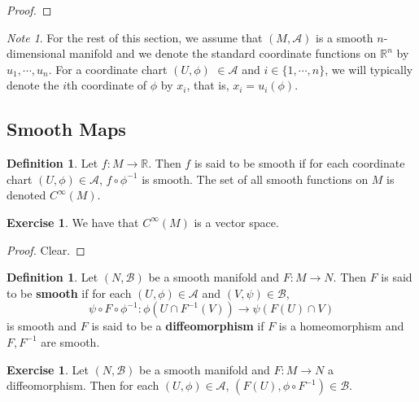 \documentclass[12pt]{amsart}
\theoremstyle{definition}
\newtheorem{defn}[definition]{Definition}
\theoremstyle{remark}
\newtheorem{note}[remark]{Note}
\theoremstyle{definition}
\newtheorem{ex}[definition]{Exercise}
\newcommand{\R}{\mathbb{R}}
\newcommand{\MA}{\mathcal{A}}
\newcommand{\MB}{\mathcal{B}}
\begin{document}
	\begin{proof}
		
	\end{proof}
	
	\begin{note}
		For the rest of this section, we assume that $(M, \MA)$ is a smooth $n$-dimensional manifold and we denote the standard coordinate functions on $\R^n$ by $u_1, \cdots, u_n$. For a coordinate chart $(U, \phi)$ $\in \MA$ and $i \in \{1, \cdots, n\}$, we will typically denote the $i$th coordinate of $\phi$ by $x_i$, that is,  $x_i = u_i(\phi)$.
	\end{note}
	
	\newpage 
	
	
	\subsection{Smooth Maps}	
	
	\begin{defn}
		Let $f: M \rightarrow \R$. Then $f$ is said to be smooth if for each coordinate chart $(U, \phi) \in \MA$, $f \circ \phi^{-1}$ is smooth. The set of all smooth functions on $M$ is denoted $C^{\infty}(M)$. 
	\end{defn}

	\begin{ex}
		We have that $C^{\infty}(M)$ is a vector space.
	\end{ex}

	\begin{proof}
		Clear.
	\end{proof}

	\begin{defn}
		Let $(N, \MB)$ be a smooth manifold and $F: M \rightarrow N$. Then $F$ is said to be \textbf{smooth} if for each $(U, \phi) \in \MA$ and $(V, \psi) \in \MB$, $$\psi \circ F \circ \phi^{-1}: \phi(U \cap F^{-1}(V)) \rightarrow \psi(F(U) \cap V)$$ is smooth and $F$ is said to be a \textbf{diffeomorphism} if $F$ is a homeomorphism and $F,F^{-1}$ are smooth.
	\end{defn}
	
	\begin{ex}
		Let $(N, \MB)$ be a smooth manifold and $F: M \rightarrow N$ a diffeomorphism. Then for each $(U, \phi) \in \MA$, $(F(U), \phi \circ F^{-1}) \in \MB$.
	\end{ex}
	
\end{document}
